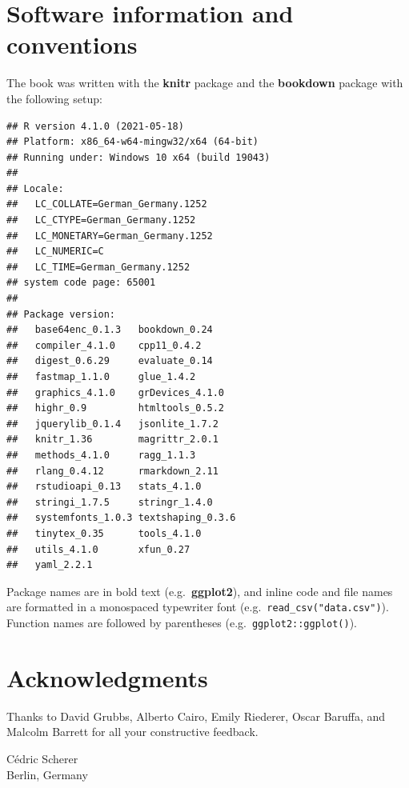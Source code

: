 \documentclass[
]{krantz}
\begin{document}
\hypertarget{software-information-and-conventions}{%
\section*{Software information and conventions}\label{software-information-and-conventions}}


The book was written with the \textbf{knitr} package \citep{xie2015} and the \textbf{bookdown} package \citep{R-bookdown} with the following setup:

\begin{verbatim}
## R version 4.1.0 (2021-05-18)
## Platform: x86_64-w64-mingw32/x64 (64-bit)
## Running under: Windows 10 x64 (build 19043)
## 
## Locale:
##   LC_COLLATE=German_Germany.1252 
##   LC_CTYPE=German_Germany.1252   
##   LC_MONETARY=German_Germany.1252
##   LC_NUMERIC=C                   
##   LC_TIME=German_Germany.1252    
## system code page: 65001
## 
## Package version:
##   base64enc_0.1.3   bookdown_0.24    
##   compiler_4.1.0    cpp11_0.4.2      
##   digest_0.6.29     evaluate_0.14    
##   fastmap_1.1.0     glue_1.4.2       
##   graphics_4.1.0    grDevices_4.1.0  
##   highr_0.9         htmltools_0.5.2  
##   jquerylib_0.1.4   jsonlite_1.7.2   
##   knitr_1.36        magrittr_2.0.1   
##   methods_4.1.0     ragg_1.1.3       
##   rlang_0.4.12      rmarkdown_2.11   
##   rstudioapi_0.13   stats_4.1.0      
##   stringi_1.7.5     stringr_1.4.0    
##   systemfonts_1.0.3 textshaping_0.3.6
##   tinytex_0.35      tools_4.1.0      
##   utils_4.1.0       xfun_0.27        
##   yaml_2.2.1
\end{verbatim}

Package names are in bold text (e.g.~\textbf{ggplot2}), and inline code and file names are formatted in a monospaced typewriter font (e.g.~\texttt{read\_csv("data.csv")}). Function names are followed by parentheses (e.g.~\texttt{ggplot2::ggplot()}).

\hypertarget{acknowledgments}{%
\section*{Acknowledgments}\label{acknowledgments}}


Thanks to David Grubbs, Alberto Cairo, Emily Riederer, Oscar Baruffa, and Malcolm Barrett for all your constructive feedback.

\begin{flushright}
Cédric Scherer\\
Berlin, Germany
\end{flushright}
\end{document}
